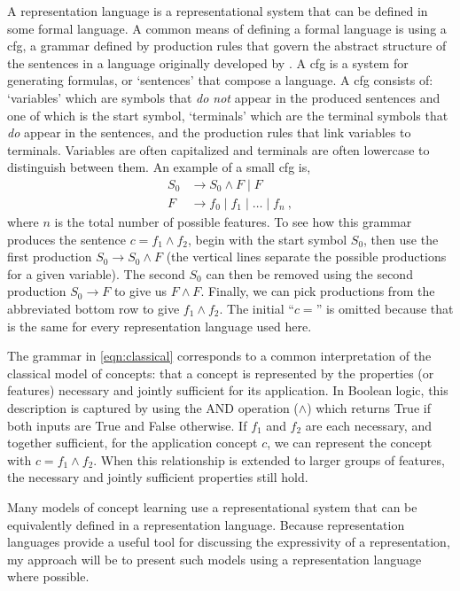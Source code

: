 \documentclass[doc,floatsintext]{apa6}
\begin{document}
A representation language is a representational system that can be defined in some formal language. A common means of defining a formal language is using a \ac{cfg}, a grammar defined by production rules that govern the abstract structure of the sentences in a language originally developed by \citet{chomsky1956}.
A \ac{cfg} is a system for generating formulas, or `sentences' that compose a language. A \ac{cfg} consists of: `variables' which are symbols that \emph{do not} appear in the produced sentences and one of which is the start symbol, `terminals' which are the terminal symbols that \emph{do} appear in the sentences, and the production rules that link variables to terminals. Variables are often capitalized and terminals are often lowercase to distinguish between them. An example of a small \ac{cfg} is,
\begin{align} \label{eqn:classical}
  S_0 &\rightarrow S_0 \wedge F \mid F  \\
  F &\rightarrow f_0 \mid f_1 \mid \dots \mid f_n ~, \nonumber
\end{align}
where $n$ is the total number of possible features. To see how this grammar produces the sentence $c=f_1 \wedge f_2$, begin with the start symbol $S_0$, then use the first production $S_0 \rightarrow S_0 \wedge F$ (the vertical lines separate the possible productions for a given variable). The second $S_0$ can then be removed using the second production $S_0 \rightarrow F$ to give us $F \wedge F$. Finally, we can pick productions from the abbreviated bottom row to give $f_1 \wedge f_2$. The initial ``$c=$'' is omitted because that is the same for every representation language used here.

The grammar in \cref{eqn:classical} corresponds to a common interpretation of the classical model of concepts: that a concept is represented by the properties (or features) necessary and jointly sufficient for its application. In Boolean logic, this description is captured by using the AND operation ($\wedge$) which returns True if both inputs are True and False otherwise. If $f_1$ and $f_2$ are each necessary, and together sufficient, for the application concept $c$, we can represent the concept with $c = f_1 \wedge f_2$. When this relationship is extended to larger groups of features, the necessary and jointly sufficient properties still hold.

Many models of concept learning use a representational system that can be equivalently defined in a representation language. Because representation languages provide a useful tool for discussing the expressivity of a representation, my approach will be to present such models using a representation language where possible.
\end{document}
